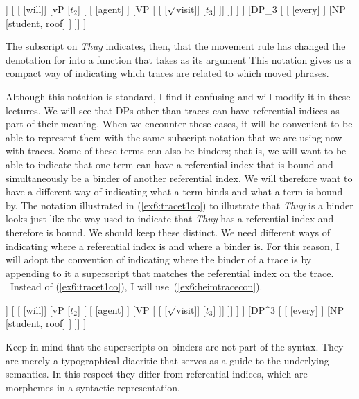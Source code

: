 \begin{exe}
\raggedright
	\ex \label{ex6:tracet1co}
	\footnotesize
	\begin{forest}
	[TP
		[TP 
			[DP_2 [Thuy, roof]]
			[	
				[ [will]]
				[vP 
					[$t_2$]				
					[
						[ [agent] ]
						[VP 
						[ 
							[ [$\surd$visit]]
							[$t_3$]
						]]
				]]
			 ]
		]
		[DP_3 [
			[ ]
			[NP [student, roof] ]
		]]
	]
	\end{forest}	
\end{exe}
The subscript on \textit{Thuy} indicates, then, that the movement rule has changed the denotation for  into a function that takes as its argument This notation gives us a compact way of indicating which traces are related to which moved phrases. 

Although this notation is standard, I find it confusing and will modify it in these lectures. We will see that DPs other than traces can have referential indices as part of their meaning. When we encounter these cases, it will be convenient to be able to represent them with the same subscript notation that we are using now with traces.  Some of these terms can also be binders; that is, we will want to be able to indicate that one term can have a referential index that is bound and simultaneously be a binder of another referential index. We will therefore want to have a different way of indicating what a term binds and what a term is bound by. The notation illustrated in (\ref{ex6:tracet1co}) to illustrate that \textit{Thuy} is a binder looks just like the way used to indicate that \textit{Thuy} has a referential index and therefore is bound. We should keep these distinct. We need different ways of indicating where a referential index is and where a binder is. For this reason, I will adopt the convention of indicating where the binder of a trace is by appending to it a superscript that matches the referential index on the trace.%
%
%
%
\ Instead of (\ref{ex6:tracet1co}), I will use~(\ref{ex6:heimtracecon}).
\begin{exe}
\raggedright
	\ex \label{ex6:heimtracecon}
	\footnotesize
	\begin{forest}
	[TP
		[TP 
			[DP^2 [Thuy, roof]]
			[	
				[ [will]]
				[vP 
					[$t_2$]				
					[
						[ [agent] ]
						[VP 
						[ 
							[ [$\surd$visit]]
							[$t_3$]
						]]
				]]
			 ]
		]
		[DP^3 [
			[ ]
			[NP [student, roof] ]
		]]
	]
	\end{forest}
\end{exe}
Keep in mind that the superscripts on binders are not part of the syntax. They are merely a typographical diacritic that serves as a guide to the underlying semantics. In this respect they differ from referential indices, which are morphemes in a syntactic representation.


